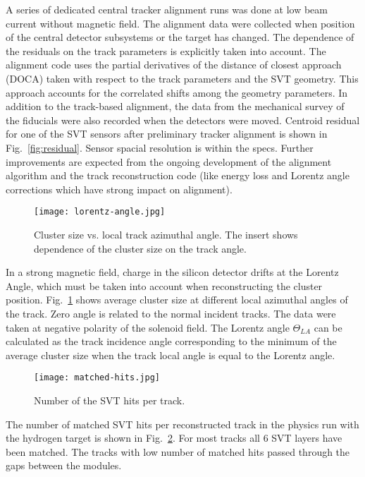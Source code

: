 A series of dedicated central tracker alignment runs was done at low beam current without magnetic field. The alignment data were collected when position of the central detector subsystems or the target has changed. The dependence of the residuals on the track parameters is explicitly taken into account. The alignment code uses the partial derivatives of the distance of closest approach (DOCA) taken with respect to the track parameters and the SVT geometry. This approach accounts for the correlated shifts among the geometry parameters. In addition to the track-based alignment, the data from the mechanical survey of the fiducials were also recorded when the detectors were moved. Centroid residual for one of the SVT sensors after preliminary tracker alignment is shown in Fig.~\ref{fig:residual}. Sensor spacial resolution is within the specs. Further improvements are expected from the ongoing development of the alignment algorithm and the track reconstruction code (like energy loss and Lorentz angle corrections which have strong impact on alignment).

\begin{figure}[hbt] 
\centering 
\texttt{[image: lorentz-angle.jpg]}
\caption{Cluster size vs. local track azimuthal angle. The insert shows dependence of the cluster size on the track angle.}
\label{fig:lorentz-angle}
\end{figure}

In a strong magnetic field, charge in the silicon detector drifts at the Lorentz Angle, which must be taken into account when reconstructing the cluster position. Fig.~\ref{fig:lorentz-angle} shows average cluster size at different local azimuthal angles of the track. Zero angle is related to the normal incident tracks. The data were taken at negative polarity of the solenoid field. The Lorentz angle $\Theta_{LA}$ can be calculated as the track incidence angle corresponding to the minimum of the average cluster size when the track local angle is equal to the Lorentz angle.

\begin{figure}[hbt] 
\centering 
\texttt{[image: matched-hits.jpg]}
\caption{Number of the SVT hits per track.}
\label{fig:matched-hits}
\end{figure}

The number of matched SVT hits per reconstructed track in the physics run with the hydrogen target is shown in Fig.~\ref{fig:matched-hits}. For most tracks all 6 SVT layers have been matched. The tracks with low number of matched hits passed through the gaps between the modules.


